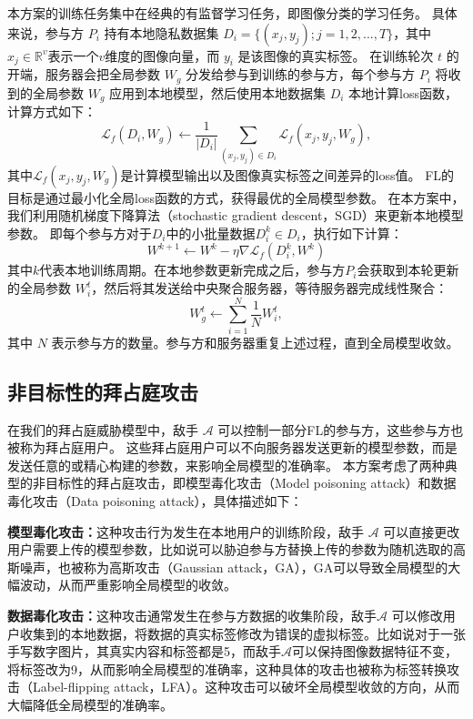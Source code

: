 本方案的训练任务集中在经典的有监督学习任务，即图像分类的学习任务。
具体来说，参与方 $P_i$ 持有本地隐私数据集 $D_i=\{(x_j, y_j);j=1,2,...,T\}$，其中$x_j\in\mathbb{R}^v$表示一个$v$维度的图像向量，而 $y_i$ 是该图像的真实标签。
在训练轮次 $t$ 的开端，服务器会把全局参数 $W_g$ 分发给参与到训练的参与方，每个参与方 $P_i$ 将收到的全局参数 $W_g$ 应用到本地模型，然后使用本地数据集 $D_i$ 本地计算loss函数，计算方式如下：
\begin{equation}
	\mathcal{L}_f(D_i, W_g) \leftarrow\frac{1}{|D_i|}\sum\limits_{(x_j,y_j)\in D_i}\mathcal{L}_f(x_j,y_j,W_g),
\end{equation}
其中$\mathcal{L}_f(x_j,y_j,W_g)$是计算模型输出以及图像真实标签之间差异的loss值。
FL的目标是通过最小化全局loss函数的方式，获得最优的全局模型参数。
在本方案中，我们利用随机梯度下降算法（stochastic gradient descent，SGD）来更新本地模型参数。
即每个参与方对于$D_i$中的小批量数据$D_i^k \in D_i$，执行如下计算：
\begin{equation}
	W^{k+1}\leftarrow W^{k}-\eta\nabla\mathcal{L}_f(D_i^k,W^k)
\end{equation}
其中$k$代表本地训练周期。在本地参数更新完成之后，参与方$P_i$会获取到本轮更新的全局参数 $W_i^t$，然后将其发送给中央聚合服务器，等待服务器完成线性聚合：
\begin{equation}
	W_g^{t}\leftarrow\sum_{i=1}^{N}\frac{1}{N}W_i^{t},
\end{equation}
其中 $N$ 表示参与方的数量。参与方和服务器重复上述过程，直到全局模型收敛。

\subsection{非目标性的拜占庭攻击}
在我们的拜占庭威胁模型中，敌手 $\mathcal{A}$ 可以控制一部分FL的参与方，这些参与方也被称为拜占庭用户。
这些拜占庭用户可以不向服务器发送更新的模型参数，而是发送任意的或精心构建的参数，来影响全局模型的准确率。
本方案考虑了两种典型的非目标性的拜占庭攻击，即模型毒化攻击（Model poisoning attack）和数据毒化攻击（Data poisoning attack），具体描述如下：
\begin{compactitem}
	\item \textbf{模型毒化攻击：}这种攻击行为发生在本地用户的训练阶段，敌手 $\mathcal{A}$ 可以直接更改用户需要上传的模型参数，比如说可以胁迫参与方替换上传的参数为随机选取的高斯噪声，也被称为高斯攻击（Gaussian attack，GA）\cite{blanchard2017machine, dong2021flod}，GA可以导致全局模型的大幅波动，从而严重影响全局模型的收敛。
	\item  \textbf{数据毒化攻击：}这种攻击通常发生在参与方数据的收集阶段，敌手$\mathcal{A}$ 可以修改用户收集到的本地数据，将数据的真实标签修改为错误的虚拟标签。比如说对于一张手写数字图片，其真实内容和标签都是5，而敌手$\mathcal{A}$可以保持图像数据特征不变，将标签改为9，从而影响全局模型的准确率，这种具体的攻击也被称为标签转换攻击（Label-flipping attack，LFA）\cite{kairouz2019advances, dong2021flod, liu2021privacy}。这种攻击可以破坏全局模型收敛的方向，从而大幅降低全局模型的准确率。
\end{compactitem}

